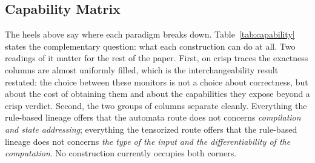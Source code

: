 \subsection{Capability Matrix}
\label{sec:theory-matrix}

The heels above say where each paradigm breaks down. Table~\ref{tab:capability} states the
complementary question: what each construction can do at all. Two readings of it matter for
the rest of the paper. First, on crisp traces the exactness columns are almost uniformly
filled, which is the interchangeability result restated: the choice between these monitors
is not a choice about correctness, but about the cost of obtaining them and about the
capabilities they expose beyond a crisp verdict. Second, the two groups of columns separate
cleanly. Everything the rule-based lineage offers that the automata route does not concerns
\emph{compilation and state addressing}; everything the tensorized route offers that the
rule-based lineage does not concerns \emph{the type of the input and the differentiability
of the computation}. No construction currently occupies both corners.

